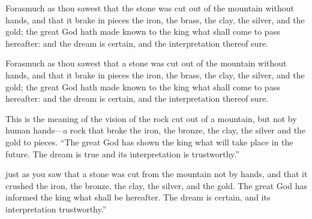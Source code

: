 			Forasmuch as thou sawest that the stone was cut out of the mountain without hands, and that it brake in pieces the iron, the brass, the clay, the silver, and the gold; the great God hath made known to the king what shall come to pass hereafter: and the dream is certain, and the interpretation thereof sure.

			\begin{versebox}
					\item[BHS] 
					\item[LXX] 
					\item[ASV] Forasmuch as thou sawest that a stone was cut out of the mountain without hands, and that it brake in pieces the iron, the brass, the clay, the silver, and the gold; the great God hath made known to the king what shall come to pass hereafter: and the dream is certain, and the interpretation thereof sure.
					\item[NIV] This is the meaning of the vision of the rock cut out of a mountain, but not by human hands—a rock that broke the iron, the bronze, the clay, the silver and the gold to pieces. “The great God has shown the king what will take place in the future. The dream is true and its interpretation is trustworthy.”
					\item[NRSV] just as you saw that a stone was cut from the mountain not by hands, and that it crushed the iron, the bronze, the clay, the silver, and the gold. The great God has informed the king what shall be hereafter. The dream is certain, and its interpretation trustworthy.”
			\end{versebox}

